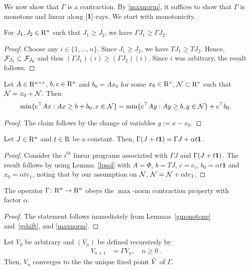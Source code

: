 We now show that $\Gamma$ is a contraction. 
By \cref{maxnorm}, it suffices to show that $\Gamma$ is monotone and linear along $[\mathbf{1}]$-rays.
We start with monotonicity.
\begin{lemma}\label{gmonotone}
For $J_1, J_2\in \mathrm{R}^n$ such that $J_1\geq J_2$, we have $\Gamma J_1\geq \Gamma J_2$.
\end{lemma}
\begin{proof}
Choose any $i\in \{1,\ldots,n\}$. 
Since $J_1\geq J_2$, we have $TJ_1\geq TJ_2$.
Hence, $\mathcal{F}_{J_1} \subset \mathcal{F}_{J_2}$ and thus $(\Gamma J_1)(i) \ge (\Gamma J_2)(i)$. 
Since $i$ was arbitrary, the result follows.
\end{proof}
\begin{lemma}\label{lpsol}
Let $A\in \mathrm{R}^{u\times v}$, $b,c\in \mathrm{R}^u$ and $b_0=Ax_0$ for 
some $x_0 \in \mathrm{R}^v$, $\mathcal{N} \subset \mathrm{R}^v$ such that $\mathcal{N} =x_0+ \mathcal{N}$. Then
\begin{align}
\min\{c^\top Ax:Ax\geq b+b_0, x\in \mathcal{N}\} =\min\{c^\top A y:Ay \geq b, y \in \mathcal{N} \}+c^\top b_0.
\end{align}
\end{lemma}
\begin{proof}
The claim follows by the change of variables $y := x-x_0$.
\end{proof}
\begin{lemma}\label{gshift}
Let $J\in \mathrm{R}^n$ and $t\in \mathrm{R}$ be a constant.
Then, $\Gamma (J+t\mathbf{1}) = \Gamma J + \alpha t \mathbf{1}$.
\end{lemma}
\begin{proof}
Consider the $i^{th}$ linear programs associated with $\Gamma J$ and $\Gamma (J+ t\mathbf{1})$. 
The result follows by using Lemma~\ref{lpsol} with $A=\Phi$, $b=TJ$, $c=e_i$, $b_0=\alpha t\mathbf{1}$ 
and $x_0=\alpha t e_1$, noting that by our assumption on $\mathcal{N}$, $\mathcal{N} = \mathcal{N} + \alpha t e_1$.
\end{proof}
\begin{theorem}\label{gmaxcontra}
The operator $\Gamma  \colon \mathrm{R}^n\rightarrow \mathrm{R}^n$ obeys the $\max$-norm contraction property with factor $\alpha$.
\end{theorem}
\begin{proof}
The statement follows immediately from Lemmas~\ref{gmonotone} and~\ref{gshift}, and \cref{maxnorm}.
\end{proof}
\begin{corollary}
Let $V_0$ be arbitrary and $(V_n)$ be defined recursively by
\begin{align}\label{pvi}
V_{n+1}&=\Gamma V_n, \quad n\geq 0\,.
\end{align}
Then, $V_n$ converges to the the unique fixed point $\tilde{V}$ of $\Gamma$.
\end{corollary}
